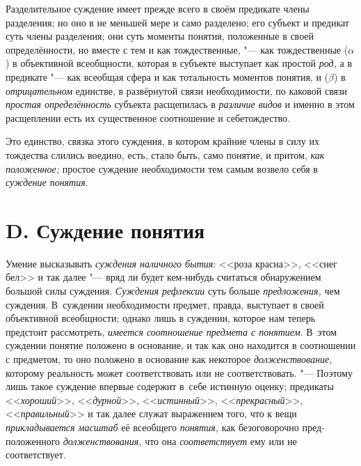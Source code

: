 Разделительное суждение имеет прежде всего в своём предикате
члены разделения; но оно в не меньшей мере и само разделено; его субъект и
предикат суть члены разделения; они суть моменты понятия, положенные в
своей определённости, но вместе с тем и как тождественные, "---
как тождественные ($\alpha $) в объективной всеобщности,
которая в субъекте выступает как простой
{\em род,} а в предикате
"--- как всеобщая сфера и как тотальность моментов понятия, и
($\beta $) в {\em отрицательном}
единстве, в развёрнутой связи необходимости, по каковой связи
{\em простая определённость}
субъекта расщепилась в
{\em различие видов} и
именно в этом расщеплении есть их существенное соотношение и
себетождество.

Это единство, связка этого суждения, в котором крайние члены в
силу их тождества слились воедино, есть, стало быть, само понятие, и
притом, {\em как положенное;}
простое суждение необходимости тем самым возвело себя в
{\em суждение понятия}.

\section[D. Суждение понятия]{D. Суждение понятия}

Умение высказывать
{\em суждения наличного бытия}:
<<роза красна>>, <<снег бел>> и так далее "--- вряд
ли будет кем-нибудь считаться обнаружением большой силы суждения.
{\em Суждения рефлексии}
суть больше
{\em предложения,} чем
суждения. В~суждении необходимости предмет, правда,
выступает в своей объективной всеобщности; однако лишь в суждении, которое
нам теперь предстоит рассмотреть,
{\em имеется соотношение предмета с
понятием}. В~этом суждении понятие положено в основание, и
так как оно находится в соотношении с предметом, то оно положено в
основание как некоторое
{\em долженствование,}
которому реальность может соответствовать или не
соответствовать. "--- Поэтому лишь такое суждение впервые
содержит в~себе истинную оценку; предикаты
<<{\em хороший}>>,
<<{\em дурной}>>,
<<{\em истинный}>>,
<<{\em прекрасный}>>,
<<{\em правильный}>> и так
далее служат выражением того, что к вещи
{\em прикладывается масштаб} её всеобщего
{\em понятия,} как
безоговорочно пред-положенного
{\em долженствования,}
что она
{\em соответствует} ему
или не соответствует.


